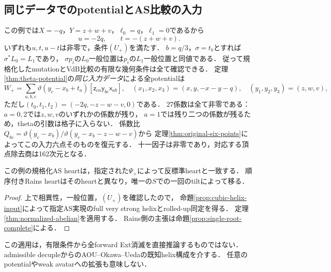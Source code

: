 \subsection{同じデータでのpotentialとAS比較の入力}
この例では$X=-q$，$Y=z+w+v$，$\ell_0=q$，$\ell_1=0$であるから
\[
 u=-2q,\qquad t=-(z+w+v).
\]
いずれも$u,t,u-t$は非零で，条件$(U_+)$を満たす．
$b=q/3$，$\sigma=t_b$とすれば$\sigma^*L_0=L_1$であり，
$\sigma p_i$の$L_0$一般位置は$p_i$の$L_1$一般位置と同値である．
従って規格化したmutationとVdB比較の有限な幾何条件は全て確認できる．
定理\ref{thm:theta-potential}の\emph{同じ入力データ}による全potentialは
\[
 W_+=\sum_{a,b,c}\vartheta(y_c-x_b+t_a)
 [\mathsf z_{ca}\mathsf y_{bc}\mathsf x_{ab}],\quad
 (x_1,x_2,x_3)=(x,y,-x-y-q),\quad(y_1,y_2,y_3)=(z,w,v),
\]
ただし$(t_0,t_1,t_2)=(-2q,-z-w-v,0)$である．
27係数は全て非零である：$a=0,2$では$z,w,v$のいずれかの係数が残り，
$a=1$では残り二つの係数が残るため，thetaの引数は格子に入らない．
係数比$Q_{bc}=\vartheta(y_c-x_b)/\vartheta(y_c-x_b-z-w-v)$から
定理\ref{thm:original-six-points}によってこの入力六点そのものを復元する．
十一因子は非零であり，対応する頂点除去商は162次元となる．

\begin{corollary}[同じ配置でのASとRainsの比較]\label{cor:single-root-AS}
この例の規格化AS heartは，指定された$\Psi_+$によって反標準heartと一致する．
順序付きRains heartはそのheartと異なり，唯一の$S$での一回のtiltによって移る．
\end{corollary}
\begin{proof}
上で相異性，一般位置，$(U_+)$を確認したので，
命題\ref{prop:cubic-helix-input}によって指定AS実現のfull very strong helixとrolled-up同定を得る．
定理\ref{thm:normalized-abelian}を適用する．
Rains側の主張は命題\ref{prop:single-root-complete}による．
\end{proof}
この適用は，有限条件から全forward Ext消滅を直接推論するものではない．
admissible decupleからのAOU--Okawa--Uedaの既知helix構成を介する．
任意のpotentialやweak avatarへの拡張も意味しない．
